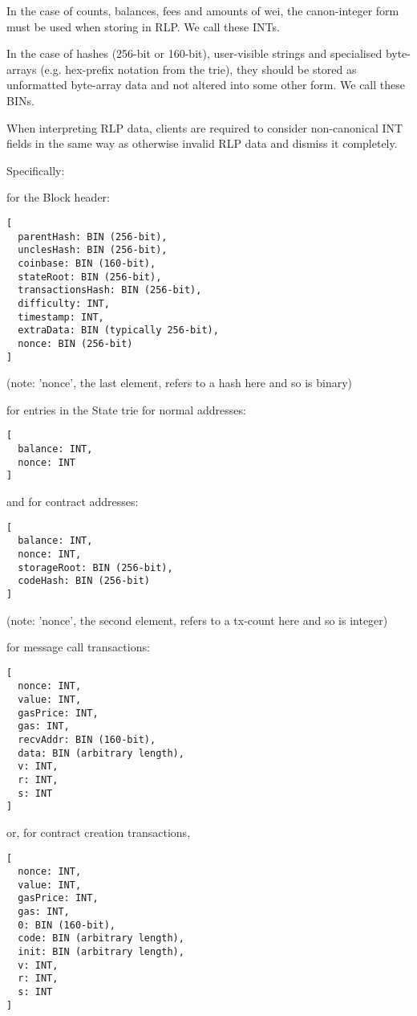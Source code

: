 \documentclass[9pt,oneside]{amsart}
\begin{document}
In the case of counts, balances, fees and amounts of wei, the canon-integer form must be used when storing in RLP. We call these INTs.

In the case of hashes (256-bit or 160-bit), user-visible strings and specialised byte-arrays (e.g. hex-prefix notation from the trie), they should be stored as unformatted byte-array data and not altered into some other form. We call these BINs.

When interpreting RLP data, clients are required to consider non-canonical INT fields in the same way as otherwise invalid RLP data and dismiss it completely.

Specifically:

for the Block header:
\begin{verbatim}
[
  parentHash: BIN (256-bit),
  unclesHash: BIN (256-bit),
  coinbase: BIN (160-bit),
  stateRoot: BIN (256-bit),
  transactionsHash: BIN (256-bit),
  difficulty: INT,
  timestamp: INT,
  extraData: BIN (typically 256-bit),
  nonce: BIN (256-bit)
]
\end{verbatim}

(note: 'nonce', the last element, refers to a hash here and so is binary)

for entries in the State trie for normal addresses:
\begin{verbatim}
[
  balance: INT,
  nonce: INT
]
\end{verbatim}

and for contract addresses:
\begin{verbatim}
[
  balance: INT,
  nonce: INT,
  storageRoot: BIN (256-bit),
  codeHash: BIN (256-bit)
]
\end{verbatim}

(note: 'nonce', the second element, refers to a tx-count here and so is integer)

for message call transactions:

\begin{verbatim}
[
  nonce: INT,
  value: INT,
  gasPrice: INT,
  gas: INT,
  recvAddr: BIN (160-bit),
  data: BIN (arbitrary length),
  v: INT,
  r: INT,
  s: INT
]
\end{verbatim}

or, for contract creation transactions,

\begin{verbatim}
[
  nonce: INT,
  value: INT,
  gasPrice: INT,
  gas: INT,
  0: BIN (160-bit),
  code: BIN (arbitrary length),
  init: BIN (arbitrary length),
  v: INT,
  r: INT,
  s: INT
]
\end{verbatim}
\end{document}
